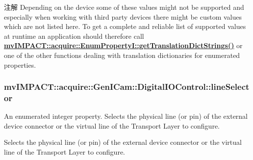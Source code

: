 \begin{DoxyNote}{注解}
Depending on the device some of these values might not be supported and especially when working with third party devices there might be custom values which are not listed here. To get a complete and reliable list of supported values at runtime an application should therefore call {\bfseries \hyperlink{classmv_i_m_p_a_c_t_1_1acquire_1_1_enum_property_i_a0ba6ccbf5ee69784d5d0b537924d26b6}{mv\+I\+M\+P\+A\+C\+T\+::acquire\+::\+Enum\+Property\+I\+::get\+Translation\+Dict\+Strings()}} or one of the other functions dealing with translation dictionaries for enumerated properties. 
\end{DoxyNote}
\hypertarget{classmv_i_m_p_a_c_t_1_1acquire_1_1_gen_i_cam_1_1_digital_i_o_control_afbd78071c4f6edc4bf4dca924c969e97}{
\subsubsection[{line\+Selector}]{ mv\+I\+M\+P\+A\+C\+T\+::acquire\+::\+Gen\+I\+Cam\+::\+Digital\+I\+O\+Control\+::line\+Selector}}\label{classmv_i_m_p_a_c_t_1_1acquire_1_1_gen_i_cam_1_1_digital_i_o_control_afbd78071c4f6edc4bf4dca924c969e97}


An enumerated integer property. Selects the physical line (or pin) of the external device connector or the virtual line of the Transport Layer to configure. 

Selects the physical line (or pin) of the external device connector or the virtual line of the Transport Layer to configure.

